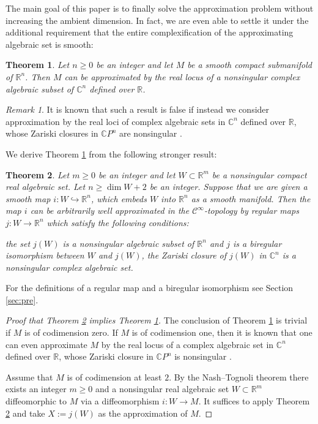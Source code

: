 \documentclass{amsart}
\theoremstyle{plain}
\newtheorem{thm}{Theorem}[section]
\theoremstyle{definition}
\theoremstyle{remark}
\newtheorem{rem}{Remark}[thm]
\numberwithin{equation}{thm} %
\renewcommand{\item}{\refstepcounter{equation}\olditem}
\newcommand{\R}{\mathbb{R}}
\newcommand{\C}{\mathbb{C}}
\begin{document}
The main goal of this paper is to finally solve the approximation problem without increasing the ambient dimension. In fact, we are even able to settle it under the additional requirement that the entire complexification of the approximating algebraic set is smooth:
\begin{thm}\label{thm:NT}
Let $n\geq 0$ be an integer and let $M$ be a smooth compact submanifold of $\R^n$. Then $M$ can be approximated by the real locus of a nonsingular complex algebraic subset of $\C^n$ defined over $\R$.
\end{thm}
\begin{rem}
It is known that such a result is false if instead we consider approximation by the real loci of complex algebraic sets in $\C^n$ defined over $\R$, whose Zariski closures in $\C P^n$ are nonsingular \cite{akbulutTranscendentalSubmanifoldsRn1993}. 
\end{rem}
We derive Theorem \ref{thm:NT} from the following stronger result:
\begin{thm}\label{thm:main}
Let $m\geq 0$ be an integer and let $W\subset \R^m$ be a nonsingular compact real algebraic set. Let $n\geq \dim W+2$ be an integer. Suppose that we are given a smooth map $i:W\hookrightarrow \R^n$, which embeds $W$ into $\R^n$ as a smooth manifold. Then the map $i$ can be arbitrarily well approximated in the $\mathcal C^\infty$-topology by regular maps $j:W\rightarrow \R^n$ which satisfy the following conditions:
\begin{enumerate}
    \item the set $j(W)$ is a nonsingular algebraic subset of $\R^n$ and $j$ is a biregular isomorphism between $W$ and $j(W)$,
    \item the Zariski closure of $j(W)$ in $\C^n$ is a nonsingular complex algebraic set.
\end{enumerate}
\end{thm}
For the definitions of a regular map and a biregular isomorphism see Section \ref{sec:pre}.
\begin{proof}[Proof that Theorem \ref{thm:main} implies Theorem \ref{thm:NT}]
The conclusion of Theorem \ref{thm:NT} is trivial if $M$ is of codimension zero. If $M$ is of codimension one, then it is known that one can even approximate $M$ by the real locus of a complex algebraic set in $\C^n$ defined over $\R$, whose Zariski closure in $\C P^n$ is nonsingular \cite[Theorem 7.1]{bochnakVectorBundlesReal1989}.

Assume that $M$ is of codimension at least $2$. By the Nash--Tognoli theorem \cite{tognoliSuCongetturaDi1973} there exists an integer $m\geq 0$ and a nonsingular real algebraic set $W\subset \R^m$ diffeomorphic to $M$ via a diffeomorphism $i:W\rightarrow M$. It suffices to apply Theorem \ref{thm:main} and take $X:=j(W)$ as the approximation of $M$.
\end{proof}
\end{document}
